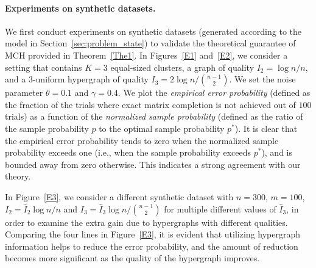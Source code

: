 \documentclass{article}
\begin{document}
\paragraph{Experiments on synthetic datasets.} We first conduct experiments on synthetic datasets (generated according to the model in Section~\ref{sec:problem_state}) to validate the theoretical guarantee of MCH provided in Theorem~\ref{The1}. In Figures~\ref{E1} and~\ref{E2}, we consider a setting that contains $K=3$ equal-sized clusters, a graph of quality $I_2 = \log n/n$, and a $3$-uniform hypergraph of quality $I_3 =2 \log n/\binom{n-1}{2}$. We set the noise parameter $\theta = 0.1$ and $\gamma=0.4$. We plot the \emph{empirical error probability} (defined as the fraction of the trials where exact matrix completion is not achieved out of $100$ trials) as a function of the \emph{normalized sample probability} (defined as the ratio of the sample probability $p$ to the optimal sample probability $p^*$).  It is clear that the empirical error probability tends to zero when the normalized sample probability exceeds one (i.e., when the sample probability exceeds $p^*$), and is bounded away from zero otherwise.  This indicates a strong agreement with our theory. 

In Figure~\ref{E3}, we consider a different synthetic dataset with $n=300$, $m=100$, $I_2=\hat{I}_2 \log n/ n$ and $I_3 = \hat{I}_3 \log n/\binom{n-1}{2}$ for multiple different values of $\hat{I}_3$, in order to examine the extra gain due to hypergraphs with different qualities. Comparing the four lines in Figure~\ref{E3}, it is evident that utilizing hypergraph information helps to reduce the error probability, and the amount of reduction becomes more significant as the quality of the hypergraph improves.

\end{document}
